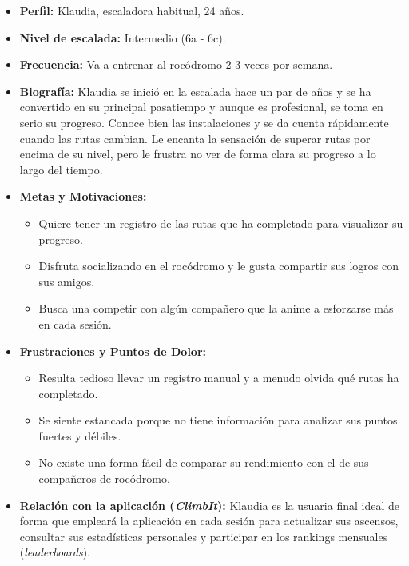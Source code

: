 \begin{itemize}
    \item \textbf{Perfil:} Klaudia, escaladora habitual, 24 años.
    \item \textbf{Nivel de escalada:} Intermedio (6a - 6c).
    \item \textbf{Frecuencia:} Va a entrenar al rocódromo 2-3 veces por semana.
    \item \textbf{Biografía:} Klaudia se inició en la escalada hace un par de años y se ha convertido en su principal pasatiempo y aunque es profesional, se toma en serio su progreso. Conoce bien las instalaciones y se da cuenta rápidamente cuando las rutas cambian. Le encanta la sensación de superar rutas por encima de su nivel, pero le frustra no ver de forma clara su progreso a lo largo del tiempo.
    \item \textbf{Metas y Motivaciones:}
    \begin{itemize}
        \item Quiere tener un registro de las rutas que ha completado para visualizar su progreso.
        \item Disfruta socializando en el rocódromo y le gusta compartir sus logros con sus amigos.
        \item Busca una competir con algún compañero que la anime a esforzarse más en cada sesión.

    \end{itemize}

    \item \textbf{Frustraciones y Puntos de Dolor:}
    \begin{itemize}
        \item Resulta tedioso llevar un registro manual y a menudo olvida qué rutas ha completado.
        \item Se siente estancada porque no tiene información para analizar sus puntos fuertes y débiles.
        \item No existe una forma fácil de comparar su rendimiento con el de sus compañeros de rocódromo.
    \end{itemize}

    \item \textbf{Relación con la aplicación (\textit{ClimbIt}):} Klaudia es la usuaria final ideal de forma que empleará la aplicación en cada sesión para actualizar sus ascensos, consultar sus estadísticas personales y participar en los rankings mensuales (\textit{leaderboards}).
\end{itemize}

